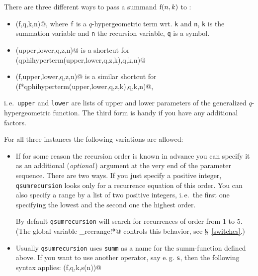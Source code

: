 There are three different ways to pass a summand $\fcn{f}{n,k}$
to {\verb@qsumrecursion@}:
%
\begin{itemize}
	\item {\verb@qsumrecursion(f,q,k,n)@}, where \texttt{f} is a
		$q$-hypergeometric term wrt. \texttt{k} and \texttt{n},
		\texttt{k} is the summation variable and \texttt{n} the recursion
		variable, \texttt{q} is a symbol.
	\item {\verb@qsumrecursion(upper,lower,q,z,n)@} is a shortcut for \\
		{\verb@qsumrecursion(qphihyperterm(upper,lower,q,z,k),q,k,n)@}
	\item {\verb@qsumrecursion(f,upper,lower,q,z,n)@} is a similar 
		shortcut for\\
		{\verb@qsumrecursion(f*qphihyperterm(upper,lower,q,z,k),q,k,n)@},
\end{itemize}
%
i.\,e.\ \texttt{upper} and \texttt{lower} are lists of upper and lower
parameters of the generalized $q$-hypergeometric function.
The third form is handy if you have any additional factors.

For all three instances the following variations are allowed:
\begin{itemize}
	\item If for some reason the recursion order is known in
		advance you can specify it as an additional ({\sl optional}\,)
		argument at the very end of the parameter sequence. There are two
		ways. If you just specify a positive integer, 
		\texttt{qsumrecursion} looks only for a recurrence equation of this order.
		You can also specify a range by a list of two positive integers,
		i.\,e.\ the first one specifying the lowest and the second one the
		highest order.

		By default \texttt{qsumrecursion} will search for recurrences
		of order from 1 to 5. (The global variable 
		{\verb@qsumrecursion_recrange!*@} controls this behavior,
		see \S~\ref{switches}.)
	\item Usually \texttt{qsumrecursion} uses \texttt{summ} as a name
		for the $\mathrm{summ}$-function defined above. If you want
		to use another operator, say e.\,g. \texttt{s}, then the
		following syntax applies: {\verb@qsumrecursion(f,q,k,s(n))@}
\end{itemize}

